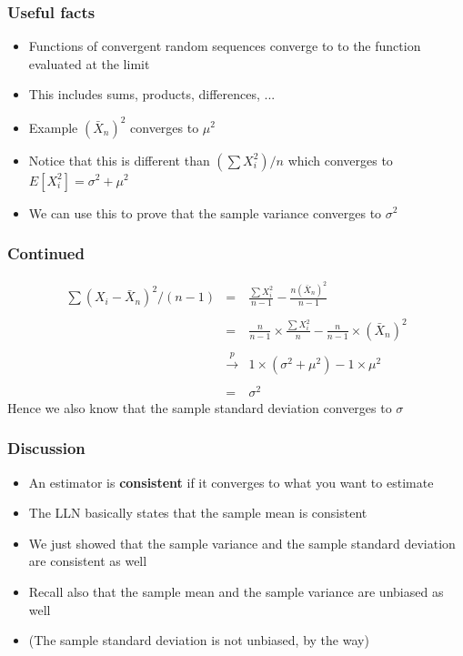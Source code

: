 \documentclass[aspectratio=169]{beamer}
\begin{document}
\begin{frame}\frametitle{Useful facts}
  \begin{itemize}
  \item Functions of convergent random sequences converge to 
    to the function evaluated at the limit
  \item This includes sums, products, differences, ...
  \item Example $(\bar X_n) ^2$ converges to $\mu^2$
  \item Notice that this is different than $(\sum X_i^2) / n$ which converges
    to $E[X_i^2] = \sigma^2 + \mu^2$
  \item We can use this to prove that the sample variance converges to
    $\sigma^2$
  \end{itemize}
\end{frame}

\begin{frame}\frametitle{Continued}
  \begin{eqnarray*}
    \sum (X_i - \bar X_n)^2 / (n - 1) & =  & \frac{\sum X_i^2}{n - 1}  - \frac{n (\bar X_n)^2}{n - 1}  \\ \\
    & = & \frac{n}{n-1}\times \frac{\sum X_i^2}{n} - \frac{n}{n-1} \times (\bar X_n)^ 2\\ \\
    & \stackrel{p}{\rightarrow} & 1 \times (\sigma^2 + \mu^2) - 1 \times \mu^2 \\ \\
    & = & \sigma^2 
  \end{eqnarray*}
  Hence we also know that the sample standard deviation converges to
  $\sigma$
\end{frame}

\begin{frame}\frametitle{Discussion}
  \begin{itemize}
  \item An estimator is {\bf consistent} if it converges to what you want to estimate
  \item The LLN basically states that the sample mean is consistent
  \item We just showed that the sample variance and the sample standard deviation are
    consistent as well
  \item Recall also that the sample mean and the sample variance are unbiased as well
  \item (The sample standard deviation is not unbiased, by the way)
  \end{itemize}
\end{frame}
\end{document}
